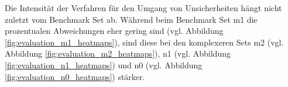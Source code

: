 Die Intensität der Verfahren für den Umgang von Unsicherheiten hängt nicht zuletzt vom Benchmark Set ab. Während beim Benchmark Set m1 die prozentualen Abweichungen eher gering sind (vgl. Abbildung \ref{fig:evaluation_m1_heatmaps}), sind diese bei den komplexeren Sets m2 (vgl. Abbildung \ref{fig:evaluation_m2_heatmaps}), n1 (vgl. Abbildung \ref{fig:evaluation_n1_heatmaps}) und n0 (vgl. Abbildung \ref{fig:evaluation_n0_heatmaps}) stärker. 


